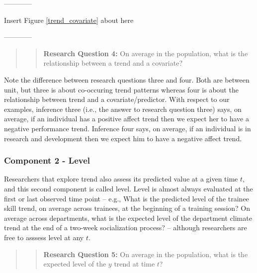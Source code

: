 \documentclass[english,,man]{apa6}
\begin{document}
\begin{center}

------------

Insert Figure \ref{trend_covariate} about here

------------

\end{center}

\begin{quote}
\begin{quote}
\textbf{Research Question 4:} On average in the population, what is the relationship between a trend and a covariate?
\end{quote}
\end{quote}

Note the difference between research questions three and four. Both are between unit, but three is about co-occuring trend patterns whereas four is about the relationship between trend and a covariate/predictor. With respect to our examples, inference three (i.e., the answer to research question three) says, on average, if an individual has a positive affect trend then we expect her to have a negative performance trend. Inference four says, on average, if an individual is in research and development then we expect him to have a negative affect trend.

\hypertarget{component-2---level}{%
\subsubsection{Component 2 - Level}\label{component-2---level}}

Researchers that explore trend also assess its predicted value at a given time \(t\), and this second component is called level. Level is almost always evaluated at the first or last observed time point -- e.g., What is the predicted level of the trainee skill trend, on average across trainees, at the beginning of a training session? On average across departments, what is the expected level of the department climate trend at the end of a two-week socialization process? -- although researchers are free to asssess level at any \(t\).

\begin{quote}
\begin{quote}
\textbf{Research Question 5:} On average in the population, what is the expected level of the \(y\) trend at time \(t\)?
\end{quote}
\end{quote}
\end{document}
